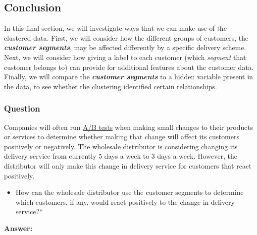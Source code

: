 \documentclass[11pt]{article}
\providecommand{\tightlist}{%
      \setlength{\itemsep}{0pt}\setlength{\parskip}{0pt}}
\begin{document}
    \subsection{Conclusion}\label{conclusion}

    In this final section, we will investigate ways that we can make use of
the clustered data. First, we will consider how the different groups of
customers, the \textbf{\emph{customer segments}}, may be affected
differently by a specific delivery scheme. Next, we will consider how
giving a label to each customer (which \emph{segment} that customer
belongs to) can provide for additional features about the customer data.
Finally, we will compare the \textbf{\emph{customer segments}} to a
hidden variable present in the data, to see whether the clustering
identified certain relationships.

    \subsubsection{Question}\label{question}

Companies will often run
\href{https://en.wikipedia.org/wiki/A/B_testing}{A/B tests} when making
small changes to their products or services to determine whether making
that change will affect its customers positively or negatively. The
wholesale distributor is considering changing its delivery service from
currently 5 days a week to 3 days a week. However, the distributor will
only make this change in delivery service for customers that react
positively.

\begin{itemize}
\tightlist
\item
  How can the wholesale distributor use the customer segments to
  determine which customers, if any, would react positively to the
  change in delivery service?*
\end{itemize}

    \textbf{Answer:}
\end{document}
